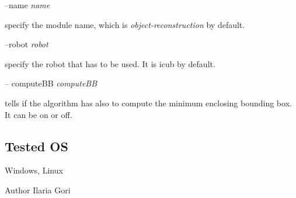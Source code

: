 --name {\itshape name} 
\begin{DoxyItemize}
\item specify the module name, which is {\itshape object-\/reconstruction} by default.
\end{DoxyItemize}

--robot {\itshape robot} 
\begin{DoxyItemize}
\item specify the robot that has to be used. It is icub by default.
\end{DoxyItemize}

-- compute\+BB {\itshape compute\+BB} 
\begin{DoxyItemize}
\item tells if the algorithm has also to compute the minimum enclosing bounding box. It can be on or off.
\end{DoxyItemize}\hypertarget{group__handIKModule_tested_os_sec}{}\subsection{Tested OS}\label{group__handIKModule_tested_os_sec}
Windows, Linux

\begin{DoxyAuthor}{Author}
Ilaria Gori 
\end{DoxyAuthor}
